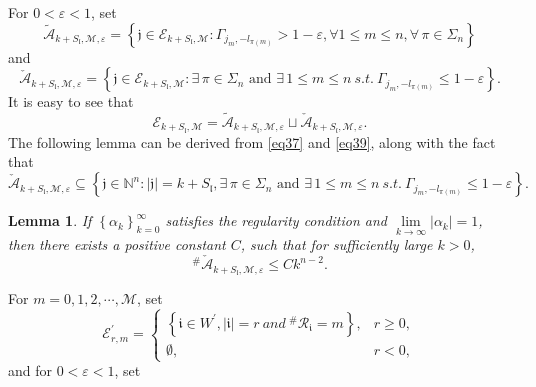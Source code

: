 \documentclass[11pt]{article}
\theoremstyle{plain}
\newtheorem{lem}[thm]{Lemma}
\theoremstyle{definition}
\begin{document}
{For $0< \varepsilon < 1$, set
\begin{equation}
	\tilde{\mathcal{A}}_{k+S_\mathfrak{l},\mathscr{M},\varepsilon } =\left \{ \mathfrak{j}  \in \mathcal{E}_{k+S_\mathfrak{l},\mathscr{M} }:\Gamma_{j_{m},-l_{\pi  (m)}} > 1 - \varepsilon,  \forall 1 \leq m \leq n, \forall \, \pi \in \Sigma_{n}   \right \}
\end{equation}
and
\begin{equation}\label{xianzai4}\check{\mathcal{A}}  _{k+S_\mathfrak{l},\mathscr{M},\varepsilon } =\left \{ \mathfrak{j}  \in \mathcal{E}_{k+S_\mathfrak{l},\mathscr{M} }:\exists \, \pi \in \Sigma_{n} \text{ and } \exists \, 1 \le m \le n ~s.t.~
\Gamma_{j_{m},-l_{\pi  (m)}} \le 1  - \varepsilon \right \}.\end{equation}
It is easy to see that
\begin{equation}\label{eqA16}
	\mathcal{E}_{k+S_\mathfrak{l},\mathscr{M} } = \tilde{\mathcal{A}}_{k+S_\mathfrak{l},\mathscr{M},\varepsilon } \sqcup \check{\mathcal{A}}  _{k+S_\mathfrak{l},\mathscr{M},\varepsilon }.
\end{equation}
The following lemma can be derived from \eqref{eq37} and \eqref{eq39}, along with the fact that
$$\check{\mathcal{A}}_{k+S_\mathfrak{l},\mathscr{M} ,\varepsilon}\subseteq \left \{ \mathfrak{j} \in \mathbb{N}^{n}:|\mathfrak{j}|=k+S_\mathfrak{l}, 
			\exists \, \pi \in \Sigma_{n} \text{ and } \exists \, 1 \le m \le n ~s.t.~
			\Gamma_{j_{m},-l_{\pi  (m)}} \le 1  - \varepsilon \right\}.$$
\begin{lem}\label{lemmaA.6}
	If $\left \{ \alpha _{k}  \right \} _{k=0}^{\infty }$ satisfies the regularity condition and $\lim\limits_{k\to\infty}|\alpha_k| = 1$, then there exists a positive constant $C$, such that for sufficiently large $ k >0$, 
	\begin{equation}\label{xianzai3}^{\#  } \check{\mathcal{A}}_{k+S_\mathfrak{l},\mathscr{M} ,\varepsilon}  \le C k ^{n-2}.\end{equation}
\end{lem}
For $m=0,1,2,\cdots ,\mathscr{M}$, set
\begin{equation}\label{eqA3511}
	\mathcal{E}_{r,m}^{\prime} = \begin{cases}
		\left \{ \mathfrak{i} \in W^{\prime}, \left | \mathfrak{i}  \right |=r \ and \   ^{\#  } \mathcal{R}_{\mathfrak{i}  }  =m   \right \},& r \geq 0, \\
		\emptyset,& r < 0,
	\end{cases}
\end{equation}
and for $0< \varepsilon < 1$, set
}
\end{document}
